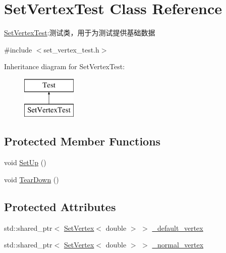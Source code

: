 \hypertarget{class_set_vertex_test}{}\section{Set\+Vertex\+Test Class Reference}
\label{class_set_vertex_test}


\hyperlink{class_set_vertex_test}{Set\+Vertex\+Test}\+:测试类，用于为测试提供基础数据  




{\ttfamily \#include $<$set\+\_\+vertex\+\_\+test.\+h$>$}

Inheritance diagram for Set\+Vertex\+Test\+:\begin{figure}[H]
\begin{center}
\leavevmode
\includegraphics[height=2.000000cm]{class_set_vertex_test}
\end{center}
\end{figure}
\subsection*{Protected Member Functions}
\begin{DoxyCompactItemize}
\item 
void \hyperlink{class_set_vertex_test_a69651499454a1fea72d3ec2c4c1db15c}{Set\+Up} ()
\item 
void \hyperlink{class_set_vertex_test_a0c1de08f51a7ce42aa7cdc321715afaa}{Tear\+Down} ()
\end{DoxyCompactItemize}
\subsection*{Protected Attributes}
\begin{DoxyCompactItemize}
\item 
std\+::shared\+\_\+ptr$<$ \hyperlink{struct_introduction_to_algorithm_1_1_graph_algorithm_1_1_set_vertex}{Set\+Vertex}$<$ double $>$ $>$ \hyperlink{class_set_vertex_test_a886fbbe6fd5a4e4c954f2ff38951f90b}{\+\_\+default\+\_\+vertex}
\item 
std\+::shared\+\_\+ptr$<$ \hyperlink{struct_introduction_to_algorithm_1_1_graph_algorithm_1_1_set_vertex}{Set\+Vertex}$<$ double $>$ $>$ \hyperlink{class_set_vertex_test_af78af1aa633b65214ed39e8956beee39}{\+\_\+normal\+\_\+vertex}
\end{DoxyCompactItemize}


